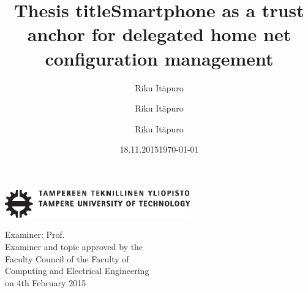 \documentclass[12pt,a4paper,english]{tutthesis}
\author{Riku Itäpuro}
\title{Thesis title}      %
\author{Riku Itäpuro}
\title{Smartphone as a trust anchor for delegated home net configuration management}
\author{Riku Itäpuro}
\date{18.11.2015}
\title{}
\begin{document}



\newpage             %

 \pagestyle{headings}
 \thispagestyle{empty}
\date\today
 \vspace*{-.5cm}\noindent
 \includegraphics[width=8cm]{tty_tut_logo}   %

\vspace{6.8cm}
\maketitle
\vspace{6.7cm} %
 
\begin{flushright}  
  \begin{minipage}[c]{6.8cm}
    \begin{spacing}{1.0}
      \textsf{Examiner: Prof. \@examiner}\\
      \textsf{Examiner and topic approved by the}\\ 
      \textsf{Faculty Council of the Faculty of} \\
      \textsf{Computing and Electrical Engineering} \\
      \textsf{on 4th February 2015}\\
    \end{spacing}
  \end{minipage}
\end{flushright}


\if@twoside
\clearpage
\fi
\end{document}
